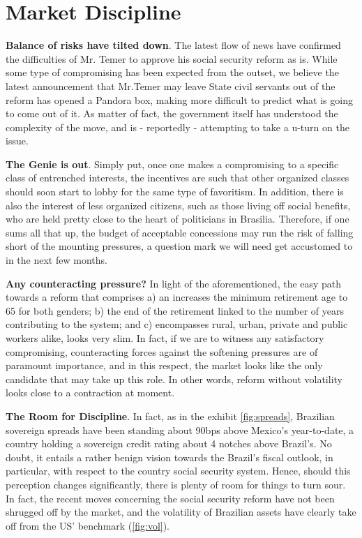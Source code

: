 \documentclass{report}
\begin{document}
\section{Market Discipline}
\label{sec:orgee9a00d}
\begin{compactitem}[$\diamond$]
\item \textbf{Balance of risks have tilted down}. The latest flow of news have
confirmed the difficulties of Mr. Temer to approve his social
security reform as is. While some type of compromising has been
expected from the outset, we believe the latest announcement that
Mr.Temer may leave State civil servants out of the reform has opened
a Pandora box, making more difficult to predict what is going to
come out of it. As matter of fact, the government itself has
understood the complexity of the move, and is - reportedly -
attempting to take a u-turn on the issue.

\item \textbf{The Genie is out}. Simply put, once one makes a
compromising to a specific class of entrenched interests, the
incentives are such that other organized classes should soon start
to lobby for the same type of favoritism. In addition, there is also
the interest of less organized citizens, such as those living off
social benefits, who are held pretty close to the heart of
politicians in Brasilia. Therefore, if one sums all that up, the
budget of acceptable concessions may run the risk of falling short
of the mounting pressures, a question mark we will need get
accustomed to in the next few months.

\item \textbf{Any counteracting pressure?} In light of the aforementioned, the
easy path towards a reform that comprises a) an increases the
minimum retirement age to 65 for both genders; b) the end of the
retirement linked to the number of years contributing to the system;
and c) encompasses rural, urban, private and public workers alike,
looks very slim. In fact, if we are to witness any satisfactory
compromising, counteracting forces against the softening pressures
are of paramount importance, and in this respect, the market looks
like the only candidate that may take up this role. In other words,
reform without volatility looks close to a contraction at moment.

\item \textbf{The Room for Discipline}. In fact, as in the exhibit
\ref{fig:spreads}, Brazilian sovereign spreads have been standing
about 90bps above Mexico's year-to-date, a country holding a
sovereign credit rating about 4 notches above Brazil's. No doubt, it
entails a rather benign vision towards the Brazil's fiscal outlook,
in particular, with respect to the country social security system.
Hence, should this perception changes significantly, there is plenty
of room for things to turn sour. In fact, the recent moves
concerning the social security reform have not been shrugged off by
the market, and the volatility of Brazilian assets have clearly take
off from the US' benchmark (\ref{fig:vol}).
\end{compactitem}
\end{document}
